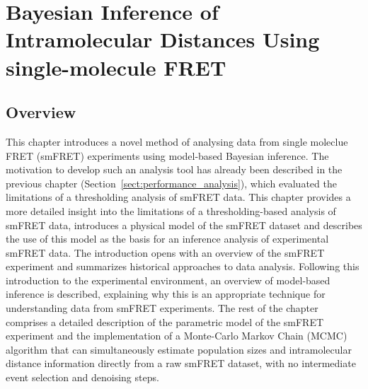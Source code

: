 \chapter{Bayesian Inference of Intramolecular Distances Using single-molecule FRET}
\label{chap:inference}

\section{Overview}
This chapter introduces a novel method of analysing data from single moleclue FRET (smFRET) experiments using model-based Bayesian inference. The motivation to develop such an analysis tool has already been described in the previous chapter (Section~\ref{sect:performance_analysis}), which evaluated the limitations of a thresholding analysis of smFRET data. This chapter provides a more detailed insight into the limitations of a thresholding-based analysis of smFRET data, introduces a physical model of the smFRET dataset and describes the use of this model as the basis for an inference analysis of experimental smFRET data. The introduction opens with an overview of the smFRET experiment and summarizes historical approaches to data analysis. Following this introduction to the experimental environment, an overview of model-based inference is described, explaining why this is an appropriate technique for understanding data from smFRET experiments. The rest of the chapter comprises a detailed description of the parametric model of the smFRET experiment and the implementation of a Monte-Carlo Markov Chain (MCMC) algorithm that can simultaneously estimate population sizes and intramolecular distance information directly from a raw smFRET dataset, with no intermediate event selection and denoising steps. 

